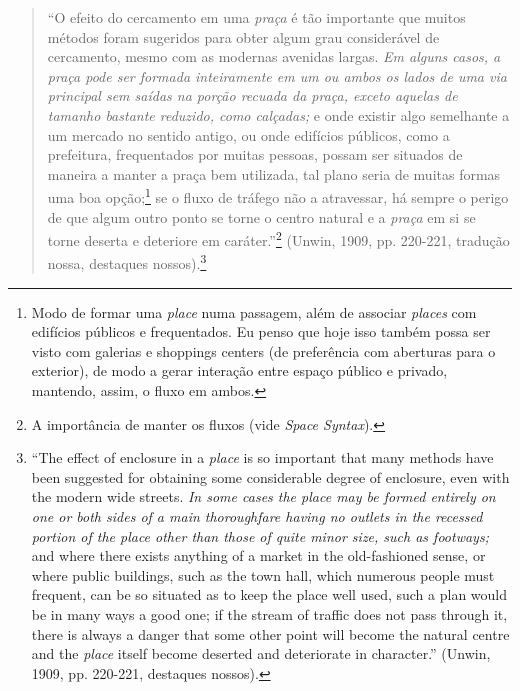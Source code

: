 \documentclass[12pt, a4paper]{book} %
\begin{document}
        \begin{quotation}
            ``O efeito do cercamento em uma \textit{praça} é tão importante que muitos métodos foram sugeridos para obter algum grau considerável de cercamento, mesmo com as modernas avenidas largas. \textit{Em alguns casos, a praça pode ser formada inteiramente em um ou ambos os lados de uma via principal sem saídas na porção recuada da praça, exceto aquelas de tamanho bastante reduzido, como calçadas;} e onde existir algo semelhante a um mercado no sentido antigo, ou onde edifícios públicos, como a prefeitura, frequentados por muitas pessoas, possam ser situados de maneira a manter a praça bem utilizada, tal plano seria de muitas formas uma boa opção;\footnote[75]{Modo de formar uma \textit{place} numa passagem, além de associar \textit{places} com edifícios públicos e frequentados.
            Eu penso que hoje isso também possa ser visto com galerias e shoppings centers (de preferência com aberturas para o exterior), de modo a gerar interação entre espaço público e privado, mantendo, assim, o fluxo em ambos.} se o fluxo de tráfego não a atravessar, há sempre o perigo de que algum outro ponto se torne o centro natural e a \textit{praça} em si se torne deserta e deteriore em caráter.''\footnote[76]{A importância de manter os fluxos (vide \textit{Space Syntax}).} (Unwin, 1909, pp. 220-221, tradução nossa, destaques nossos).\footnote[77]{``The effect of enclosure in a \textit{place} is so important that many methods have been suggested for obtaining some considerable degree of enclosure, even with the modern wide streets. \textit{In some cases the place may be formed entirely on one or both sides of a main thoroughfare having no outlets in the recessed portion of the place other than those of quite minor size, such as footways;} and where there exists anything of a market in the old-fashioned sense, or where public buildings, such as the town hall, which numerous people must frequent, can be so situated as to keep the place well used, such a plan would be in many ways a good one; if the stream of traffic does not pass through it, there is always a danger that some other point will become the natural centre and the \textit{place} itself become deserted and deteriorate in character.'' (Unwin, 1909, pp. 220-221, destaques nossos).}
        \end{quotation}
\end{document}
